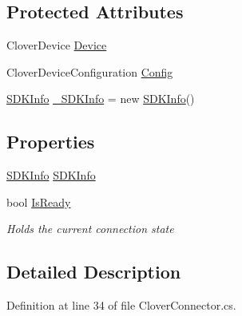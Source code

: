 \subsection*{Protected Attributes}
\begin{DoxyCompactItemize}
\item 
Clover\+Device \hyperlink{classcom_1_1clover_1_1remotepay_1_1sdk_1_1_clover_connector_ab2b2a13a2439cf33d0b83e31ba55d238}{Device}
\item 
Clover\+Device\+Configuration \hyperlink{classcom_1_1clover_1_1remotepay_1_1sdk_1_1_clover_connector_a9e2be5acbf150aad37aed2d9670f38e0}{Config}
\item 
\hyperlink{classcom_1_1clover_1_1remotepay_1_1sdk_1_1_s_d_k_info}{S\+D\+K\+Info} \hyperlink{classcom_1_1clover_1_1remotepay_1_1sdk_1_1_clover_connector_a873acd846f1efa474ad258356f2136cf}{\+\_\+\+S\+D\+K\+Info} = new \hyperlink{classcom_1_1clover_1_1remotepay_1_1sdk_1_1_s_d_k_info}{S\+D\+K\+Info}()
\end{DoxyCompactItemize}
\subsection*{Properties}
\begin{DoxyCompactItemize}
\item 
\hyperlink{classcom_1_1clover_1_1remotepay_1_1sdk_1_1_s_d_k_info}{S\+D\+K\+Info} \hyperlink{classcom_1_1clover_1_1remotepay_1_1sdk_1_1_clover_connector_ac4da6669fef5eb8611e92c7b77a19e2a}{S\+D\+K\+Info}
\item 
bool \hyperlink{classcom_1_1clover_1_1remotepay_1_1sdk_1_1_clover_connector_ad73c9809998af8cc9f8f61d8b4ec4e7b}{Is\+Ready}
\begin{DoxyCompactList}\small\item\em Holds the current connection state \end{DoxyCompactList}\end{DoxyCompactItemize}


\subsection{Detailed Description}




Definition at line 34 of file Clover\+Connector.\+cs.



